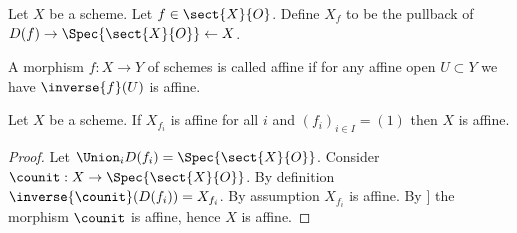 \begin{definition}
Let $X$ be a scheme.
Let $f\in \sect{X}{O}$.
Define $X_f$ to be the pullback of $D(f) \rightarrow \Spec{\sect{X}{O}} \leftarrow X$.
\end{definition}

\begin{definition}
A morphism $f:X\rightarrow Y$ of schemes is called affine if for any affine open $U\subset Y$ we have $\inverse{f}(U)$ is affine.
\end{definition}

\begin{lemma}
Let $X$ be a scheme.
If $X_{f_i}$ is affine for all $i$ 
and $(f_i)_{i\in I} =(1)$ then $X$ is affine. 
\end{lemma}

\begin{proof}
Let $\Union_i D(f_i) = \Spec{\sect{X}{O}}$.
Consider $\counit: X\rightarrow \Spec{\sect{X}{O}}$.
By definition $\inverse{\counit}(D(f_i)) = X_{f_i}$.
By assumption $X_{f_i}$ is affine.
By \cite[\cite[\href{http://stacks.math.columbia.edu/tag/01S8}{Tag 01S8}]{stacks}]
the morphism $\counit$ is affine, hence $X$ is affine.
\end{proof}